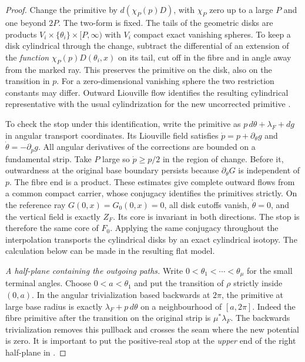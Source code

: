 \begin{proof}
Change the primitive by $d(\chi_P(p)D)$, with $\chi_P$ zero up to a large $P$ and one beyond $2P$. The two-form is fixed. The tails of the geometric disks are products $V_i\times\{\theta_i\}\times[P,\infty)$ with $V_i$ compact exact vanishing spheres. To keep a disk cylindrical through the change, subtract the differential of an extension of the \emph{function} $\chi_P(p)D(\theta_i,x)$ on its tail, cut off in the fibre and in angle away from the marked ray. This preserves the primitive on the disk, also on the transition in $p$. For a zero-dimensional vanishing sphere the two restriction constants may differ. Outward Liouville flow identifies the resulting cylindrical representative with the usual cylindrization for the new uncorrected primitive \cite[\S7.2, (7.7)--(7.9)]{GPS}.

To check the stop under this identification, write the primitive as $p\,d\theta+\lambda_F+dg$ in angular transport coordinates. Its Liouville field satisfies $\dot p=p+\partial_\theta g$ and $\dot\theta=-\partial_p g$. All angular derivatives of the corrections are bounded on a fundamental strip. Take $P$ large so $\dot p\ge p/2$ in the region of change. Before it, outwardness at the original base boundary persists because $\partial_\theta G$ is independent of $p$. The fibre end is a product. These estimates give complete outward flows from a common compact carrier, whose conjugacy identifies the primitives strictly. On the reference ray $G(0,x)=G_0(0,x)=0$, all disk cutoffs vanish, $\dot\theta=0$, and the vertical field is exactly $Z_F$. Its core is invariant in both directions. The stop is therefore the same core of $F_0$. Applying the same conjugacy throughout the interpolation transports the cylindrical disks by an exact cylindrical isotopy. The calculation below can be made in the resulting flat model.

\medskip
\noindent\emph{A half-plane containing the outgoing paths.}
Write $0<\theta_1<\cdots<\theta_\mu$ for the small terminal angles. Choose $0<a<\theta_1$ and put the transition of $\rho$ strictly inside $(0,a)$. In the angular trivialization based backwards at $2\pi$, the primitive at large base radius is exactly $\lambda_F+p\,d\theta$ on a neighbourhood of $[a,2\pi]$. Indeed the fibre primitive after the transition on the original strip is $\mu^*\lambda_F$. The backwards trivialization removes this pullback and crosses the seam where the new potential is zero. It is important to put the positive-real stop at the \emph{upper} end of the right half-plane in \cite[\S8.6]{GPS}.


\end{proof}
